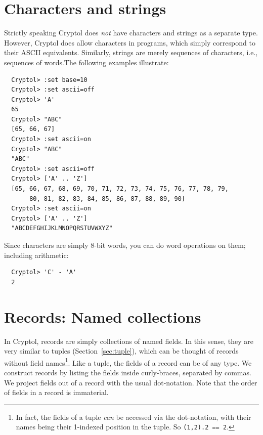 \section{Characters and strings}
\label{sec:charstring}

Strictly speaking Cryptol does {\em not} have characters and strings
as a separate type. However, Cryptol does allow characters in
programs, which simply correspond to their ASCII
equivalents. Similarly, strings are merely sequences of characters,
i.e., sequences of words.\indTheStringType\indTheCharType The
following examples illustrate:
\begin{Verbatim}
  Cryptol> :set base=10
  Cryptol> :set ascii=off
  Cryptol> 'A'
  65
  Cryptol> "ABC"
  [65, 66, 67]
  Cryptol> :set ascii=on
  Cryptol> "ABC"
  "ABC"
  Cryptol> :set ascii=off
  Cryptol> ['A' .. 'Z']
  [65, 66, 67, 68, 69, 70, 71, 72, 73, 74, 75, 76, 77, 78, 79, 
       80, 81, 82, 83, 84, 85, 86, 87, 88, 89, 90]
  Cryptol> :set ascii=on
  Cryptol> ['A' .. 'Z']
  "ABCDEFGHIJKLMNOPQRSTUVWXYZ"
\end{Verbatim}

\noindent Since characters are simply 8-bit words, you can do word
operations on them; including arithmetic:
\begin{Verbatim}
  Cryptol> 'C' - 'A'
  2
\end{Verbatim}

\section{Records: Named collections}
\label{sec:records}

In Cryptol, records are simply collections of named fields. In this
sense, they are very similar to tuples (Section~\ref{sec:tuple}),
which can be thought of records without field names\footnote{In fact,
  the fields of a tuple {\it can} be accessed via the dot-notation,
  with their names being their 1-indexed position in the tuple. So
  {\tt (1,2).2 == 2}.}. Like a tuple, the fields of a record can be of
any type.  We construct records by listing the fields inside
curly-braces, separated by commas.  We project fields out of a record
with the usual dot-notation.  Note that the order of fields in a
record is immaterial.\indTheRecordType\indTheTupleType

